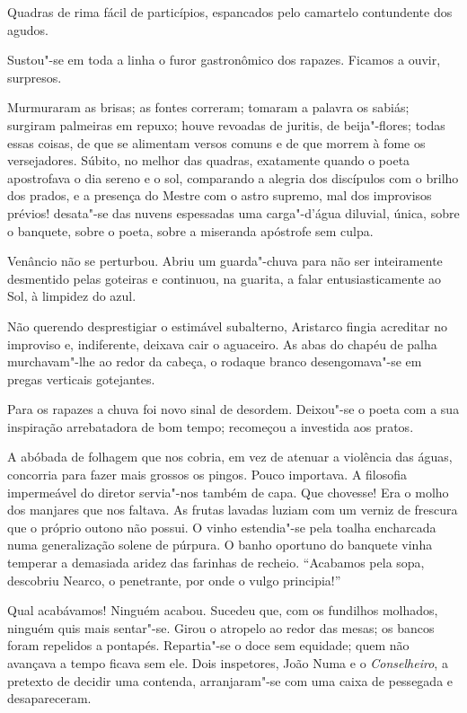Quadras de rima fácil de particípios, espancados pelo camartelo
contundente dos agudos. 

Sustou"-se em toda a linha o furor
gastronômico dos rapazes. Ficamos a ouvir, surpresos. 

Murmuraram as brisas; as fontes correram; tomaram a palavra os sabiás; 
surgiram palmeiras em repuxo; houve revoadas de juritis, de beija"-flores;
todas essas coisas, de que se alimentam versos comuns e de que morrem à
fome os versejadores. Súbito, no melhor das quadras, exatamente quando
o poeta apostrofava o dia sereno e o sol, comparando a alegria dos
discípulos com o brilho dos prados, e a presença do Mestre com o astro
supremo, mal dos improvisos prévios! desata"-se das nuvens espessadas
uma carga"-d'água diluvial, única, sobre o banquete, sobre o poeta,
sobre a miseranda apóstrofe sem culpa. 

Venâncio não se perturbou. Abriu
um guarda"-chuva para não ser inteiramente desmentido pelas goteiras e
continuou, na guarita, a falar entusiasticamente ao Sol, à limpidez do
azul. 


Não querendo desprestigiar o estimável subalterno, Aristarco
fingia acreditar no improviso e, indiferente, deixava cair o aguaceiro.
As abas do chapéu de palha murchavam"-lhe ao redor da cabeça, o
rodaque branco desengomava"-se em pregas verticais gotejantes. 

Para os rapazes a chuva foi novo sinal de desordem. Deixou"-se o poeta com a
sua inspiração arrebatadora de bom tempo; recomeçou a investida aos
pratos. 

A abóbada de folhagem que nos cobria, em vez de atenuar a
violência das águas, concorria para fazer mais grossos os pingos. Pouco
importava. A filosofia impermeável do diretor servia"-nos também de
capa. Que chovesse! Era o molho dos manjares que nos faltava. As frutas
lavadas luziam com um verniz de frescura que o próprio outono não
possui. O vinho estendia"-se pela toalha encharcada numa generalização
solene de púrpura. O banho oportuno do banquete vinha temperar a
demasiada aridez das farinhas de recheio. ``Acabamos pela sopa,
descobriu Nearco, o penetrante, por onde o vulgo principia!'' 

Qual acabávamos! Ninguém acabou. Sucedeu que, com os fundilhos molhados,
ninguém quis mais sentar"-se. Girou o atropelo ao redor das mesas; os
bancos foram repelidos a pontapés. Repartia"-se o doce sem equidade;
quem não avançava a tempo ficava sem ele. Dois inspetores, João Numa e
o \textit{Conselheiro}, a pretexto de decidir uma contenda, arranjaram"-se com
uma caixa de pessegada e desapareceram. 

